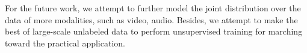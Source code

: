 \documentclass[journal]{IEEEtran}
\begin{document}
For the future work, we attempt to further model the joint distribution over the data of more modalities, such as video, audio. Besides, we attempt to make the best of large-scale unlabeled data to perform unsupervised training for marching toward the practical application.




%

%


\end{document}
